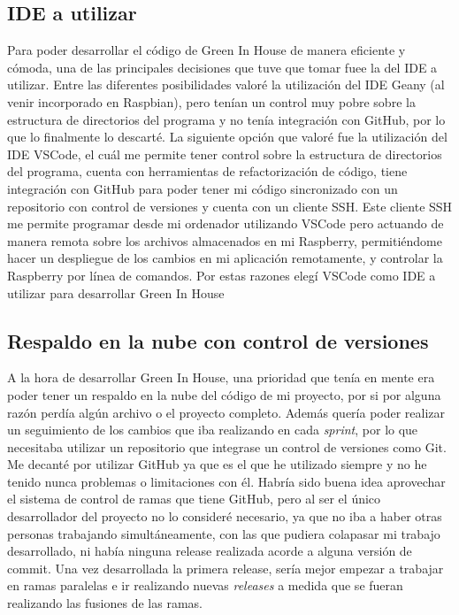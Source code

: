     \subsection{IDE a utilizar}
    Para poder desarrollar el código de Green In House de manera eficiente y cómoda, una de las principales decisiones que tuve que tomar fuee la del IDE a utilizar. Entre las diferentes posibilidades valoré la utilización del IDE Geany (al venir incorporado en Raspbian), pero tenían un control muy pobre sobre la estructura de directorios del programa y no tenía integración con GitHub, por lo que lo finalmente lo descarté. La siguiente opción que valoré fue la utilización del IDE VSCode, el cuál me permite tener control sobre la estructura de directorios del programa, cuenta con herramientas de refactorización de código, tiene integración con GitHub para poder tener mi código sincronizado con un repositorio con control de versiones y cuenta con un cliente SSH. Este cliente SSH me permite programar desde mi ordenador utilizando VSCode pero actuando de manera remota sobre los archivos almacenados en mi Raspberry, permitiéndome hacer un despliegue de los cambios en mi aplicación remotamente, y controlar la Raspberry por línea de comandos. Por estas razones elegí VSCode como IDE a utilizar para desarrollar Green In House

    \subsection{Respaldo en la nube con control de versiones}
    A la hora de desarrollar Green In House, una prioridad que tenía en mente era poder tener un respaldo en la nube del código de mi proyecto, por si por alguna razón perdía algún archivo o el proyecto completo. Además quería poder realizar un seguimiento de los cambios que iba realizando en cada \textit{sprint}, por lo que necesitaba utilizar un repositorio que integrase un control de versiones como Git. Me decanté por utilizar GitHub ya que es el que he utilizado siempre y no he tenido nunca problemas o limitaciones con él. Habría sido buena idea aprovechar el sistema de control de ramas que tiene GitHub, pero al ser el único desarrollador del proyecto no lo consideré necesario, ya que no iba a haber otras personas trabajando simultáneamente, con las que pudiera colapasar mi trabajo desarrollado, ni había ninguna release realizada acorde a alguna versión de commit. Una vez desarrollada la primera release, sería mejor empezar a trabajar en ramas paralelas e ir realizando nuevas \textit{releases} a medida que se fueran realizando las fusiones de las ramas.

